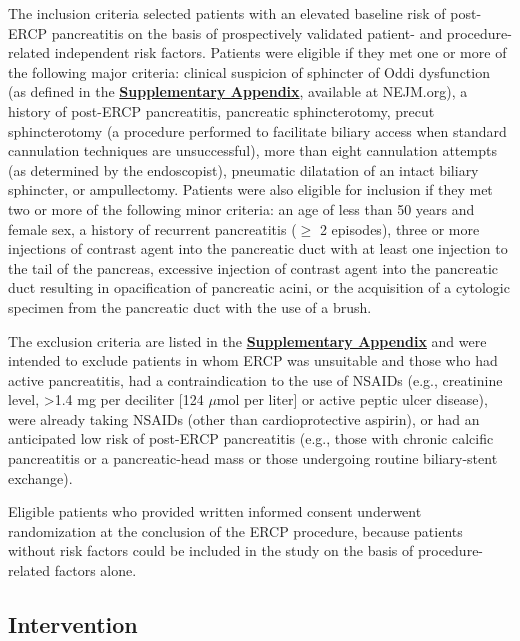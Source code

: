 \documentclass[
  10pt,
  letterpaper,
]{article}
\begin{document}
The inclusion criteria selected patients with an elevated baseline risk
of post-ERCP pancreatitis on the basis of prospectively validated
patient- and procedure-related independent risk
factors.\citep{freeman2007} Patients were eligible if they met one or
more of the following major criteria: clinical suspicion of sphincter of
Oddi dysfunction (as defined in the
\href{https://www.nejm.org/doi/suppl/10.1056/NEJMoa1111103/suppl_file/nejmoa1111103_appendix.pdf}{\textbf{Supplementary
Appendix}}, available at NEJM.org), a history of post-ERCP pancreatitis,
pancreatic sphincterotomy, precut sphincterotomy (a procedure performed
to facilitate biliary access when standard cannulation techniques are
unsuccessful), more than eight cannulation attempts (as determined by
the endoscopist), pneumatic dilatation of an intact biliary sphincter,
or ampullectomy. Patients were also eligible for inclusion if they met
two or more of the following minor criteria: an age of less than 50
years and female sex, a history of recurrent pancreatitis (\(\ge\) 2
episodes), three or more injections of contrast agent into the
pancreatic duct with at least one injection to the tail of the pancreas,
excessive injection of contrast agent into the pancreatic duct resulting
in opacification of pancreatic acini, or the acquisition of a cytologic
specimen from the pancreatic duct with the use of a brush.

The exclusion criteria are listed in the
\href{https://www.nejm.org/doi/suppl/10.1056/NEJMoa1111103/suppl_file/nejmoa1111103_appendix.pdf}{\textbf{Supplementary
Appendix}} and were intended to exclude patients in whom ERCP was
unsuitable and those who had active pancreatitis, had a contraindication
to the use of NSAIDs (e.g., creatinine level, \textgreater1.4 mg per
deciliter {[}124 \(\mu\)mol per liter{]} or active peptic ulcer
disease), were already taking NSAIDs (other than cardioprotective
aspirin), or had an anticipated low risk of post-ERCP pancreatitis
(e.g., those with chronic calcific pancreatitis or a pancreatic-head
mass or those undergoing routine biliary-stent exchange).

Eligible patients who provided written informed consent underwent
randomization at the conclusion of the ERCP procedure, because patients
without risk factors could be included in the study on the basis of
procedure-related factors alone.

\subsection{Intervention}\label{intervention}
\end{document}
